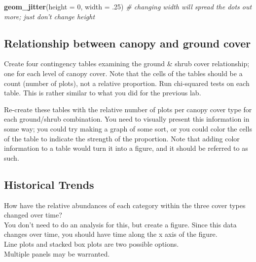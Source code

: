 \documentclass[]{book}
\newenvironment{Shaded}{\begin{snugshade}}{\end{snugshade}}
\newcommand{\KeywordTok}[1]{\textcolor[rgb]{0.13,0.29,0.53}{\textbf{#1}}}
\newcommand{\DataTypeTok}[1]{\textcolor[rgb]{0.13,0.29,0.53}{#1}}
\newcommand{\DecValTok}[1]{\textcolor[rgb]{0.00,0.00,0.81}{#1}}
\newcommand{\CommentTok}[1]{\textcolor[rgb]{0.56,0.35,0.01}{\textit{#1}}}
\newcommand{\NormalTok}[1]{#1}
\begin{document}
\begin{Shaded}
\begin{Highlighting}[]
  \KeywordTok{geom_jitter}\NormalTok{(}\DataTypeTok{height =} \DecValTok{0}\NormalTok{, }\DataTypeTok{width =}\NormalTok{ .}\DecValTok{25}\NormalTok{) }
  \CommentTok{# changing width will spread the dots out more; just don't change height}
\end{Highlighting}
\end{Shaded}

\subsection{Relationship between canopy and ground
cover}\label{relationship-between-canopy-and-ground-cover}

Create four contingency tables examining the ground \& shrub cover
relationship; one for each level of canopy cover. Note that the cells of
the tables should be a count (number of plots), not a relative
proportion. Run chi-squared tests on each table. This is rather similar
to what you did for the previous lab.

Re-create these tables with the relative number of plots per canopy
cover type for each ground/shrub combination. You need to visually
present this information in some way; you could try making a graph of
some sort, or you could color the cells of the table to indicate the
strength of the proportion. Note that adding color information to a
table would turn it into a figure, and it should be referred to as such.

\subsection{Historical Trends}\label{historical-trends}

How have the relative abundances of each category within the three cover
types changed over time?\\
You don't need to do an analysis for this, but create a figure. Since
this data changes over time, you should have time along the x axis of
the figure.\\
Line plots and stacked box plots are two possible options.\\
Multiple panels may be warranted.


\end{document}

